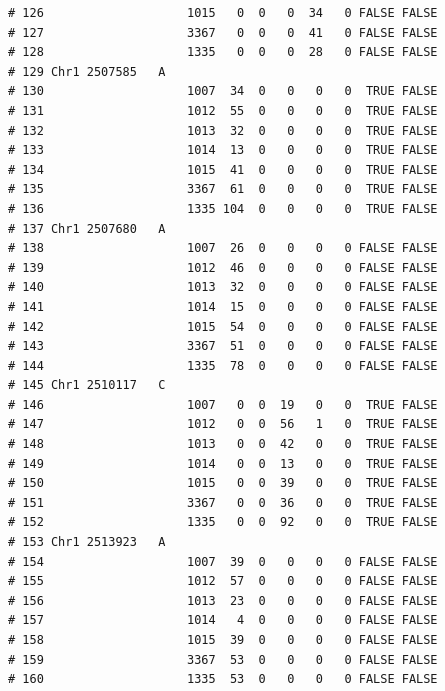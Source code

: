 \documentclass{article}\usepackage[]{graphicx}\usepackage[]{color}
\makeatletter
\newenvironment{kframe}{%
 \def\at@end@of@kframe{}%
 \ifinner\ifhmode%
  \def\at@end@of@kframe{\end{minipage}}%
  \begin{minipage}{\columnwidth}%
 \fi\fi%
 \def\FrameCommand##1{\hskip\@totalleftmargin \hskip-\fboxsep
 \colorbox{shadecolor}{##1}\hskip-\fboxsep
     \hskip-\linewidth \hskip-\@totalleftmargin \hskip\columnwidth}%
 \MakeFramed {\advance\hsize-\width
   \@totalleftmargin\z@ \linewidth\hsize
   \@setminipage}}%
 {\par\unskip\endMakeFramed%
 \at@end@of@kframe}
\newenvironment{knitrout}{}{} %
\makeatother
\begin{document}
\begin{knitrout}
\begin{kframe}
\begin{verbatim}
# 126                    1015   0  0   0  34   0 FALSE FALSE        
# 127                    3367   0  0   0  41   0 FALSE FALSE        
# 128                    1335   0  0   0  28   0 FALSE FALSE        
# 129 Chr1 2507585   A                                              
# 130                    1007  34  0   0   0   0  TRUE FALSE        
# 131                    1012  55  0   0   0   0  TRUE FALSE        
# 132                    1013  32  0   0   0   0  TRUE FALSE        
# 133                    1014  13  0   0   0   0  TRUE FALSE        
# 134                    1015  41  0   0   0   0  TRUE FALSE        
# 135                    3367  61  0   0   0   0  TRUE FALSE        
# 136                    1335 104  0   0   0   0  TRUE FALSE        
# 137 Chr1 2507680   A                                              
# 138                    1007  26  0   0   0   0 FALSE FALSE        
# 139                    1012  46  0   0   0   0 FALSE FALSE        
# 140                    1013  32  0   0   0   0 FALSE FALSE        
# 141                    1014  15  0   0   0   0 FALSE FALSE        
# 142                    1015  54  0   0   0   0 FALSE FALSE        
# 143                    3367  51  0   0   0   0 FALSE FALSE        
# 144                    1335  78  0   0   0   0 FALSE FALSE        
# 145 Chr1 2510117   C                                              
# 146                    1007   0  0  19   0   0  TRUE FALSE        
# 147                    1012   0  0  56   1   0  TRUE FALSE        
# 148                    1013   0  0  42   0   0  TRUE FALSE        
# 149                    1014   0  0  13   0   0  TRUE FALSE        
# 150                    1015   0  0  39   0   0  TRUE FALSE        
# 151                    3367   0  0  36   0   0  TRUE FALSE        
# 152                    1335   0  0  92   0   0  TRUE FALSE        
# 153 Chr1 2513923   A                                              
# 154                    1007  39  0   0   0   0 FALSE FALSE        
# 155                    1012  57  0   0   0   0 FALSE FALSE        
# 156                    1013  23  0   0   0   0 FALSE FALSE        
# 157                    1014   4  0   0   0   0 FALSE FALSE        
# 158                    1015  39  0   0   0   0 FALSE FALSE        
# 159                    3367  53  0   0   0   0 FALSE FALSE        
# 160                    1335  53  0   0   0   0 FALSE FALSE
\end{verbatim}
\end{kframe}
\end{knitrout}
\end{document}
